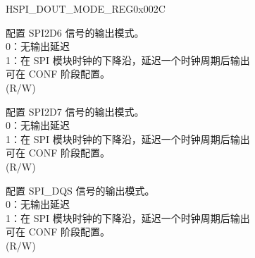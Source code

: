 \addtocounter{Regfloat}{-1}
\begin{register}{H}{SPI\_DOUT\_MODE\_REG}{0x002C}
\begin{regdesc}\begin{reglist}
\item [接上页]
\label{fielddesc:SPIDOUT6MODE}\item [SPI\_DOUT6\_MODE] 配置 SPI2D6 信号的输出模式。\\
0：无输出延迟\\
1：在 SPI 模块时钟的下降沿，延迟一个时钟周期后输出\\
可在 CONF 阶段配置。\\
(R/W)
\label{fielddesc:SPIDOUT7MODE}\item [SPI\_DOUT7\_MODE] 配置 SPI2D7 信号的输出模式。\\
0：无输出延迟\\
1：在 SPI 模块时钟的下降沿，延迟一个时钟周期后输出\\
可在 CONF 阶段配置。\\
(R/W)
\label{fielddesc:SPIDDQSMODE}\item [SPI\_D\_DQS\_MODE] 配置 SPI\_DQS 信号的输出模式。\\
0：无输出延迟\\
1：在 SPI 模块时钟的下降沿，延迟一个时钟周期后输出\\
可在 CONF 阶段配置。\\
(R/W)
\end{reglist}\end{regdesc}
\end{register}


